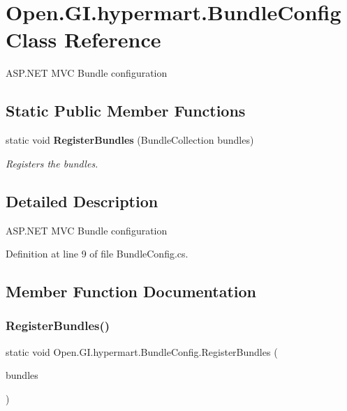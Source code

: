 \section{Open.\+G\+I.\+hypermart.\+Bundle\+Config Class Reference}
\label{class_open_1_1_g_i_1_1hypermart_1_1_bundle_config}


A\+S\+P.\+N\+ET M\+VC Bundle configuration  


\subsection*{Static Public Member Functions}
\begin{DoxyCompactItemize}
\item 
static void \textbf{ Register\+Bundles} (Bundle\+Collection bundles)
\begin{DoxyCompactList}\small\item\em Registers the bundles. \end{DoxyCompactList}\end{DoxyCompactItemize}


\subsection{Detailed Description}
A\+S\+P.\+N\+ET M\+VC Bundle configuration 



Definition at line 9 of file Bundle\+Config.\+cs.



\subsection{Member Function Documentation}
\mbox{\label{class_open_1_1_g_i_1_1hypermart_1_1_bundle_config_a7b372315a10361265239dc75c616207e}} 
\subsubsection{Register\+Bundles()}
{\footnotesize\ttfamily static void Open.\+G\+I.\+hypermart.\+Bundle\+Config.\+Register\+Bundles (\begin{DoxyParamCaption}\item[{Bundle\+Collection}]{bundles }\end{DoxyParamCaption})\hspace{0.3cm}{\ttfamily [static]}}



